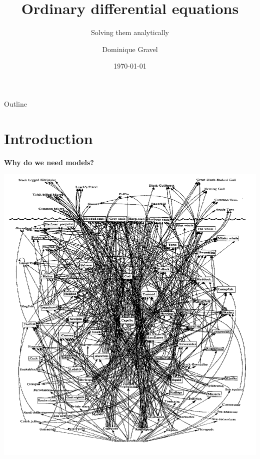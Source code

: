 \documentclass{eecslides}
\title[ODEs]{Ordinary differential equations}
\subtitle{Solving them analytically}
\author[D. Gravel]{Dominique Gravel}
\institute[Chaire de recherche EEC]{UQAR -- Chaire de Recherche EEC}
\date{\today}
\begin{document}
	\begin{frame}[plain]
		\titlepage
	\end{frame}

	\begin{frame}[plain]{Outline}
		\tableofcontents
	\end{frame}


	\section{Introduction}

	\begin{frame}
	    
		\alert{\large{\textbf{Why do we need models?}}}

	\end{frame}


	\begin{frame}
	    
		\begin{center}
			\includegraphics[height=0.85\textheight]{cod_web}
		\end{center}
	
	\end{frame}
\end{document}
